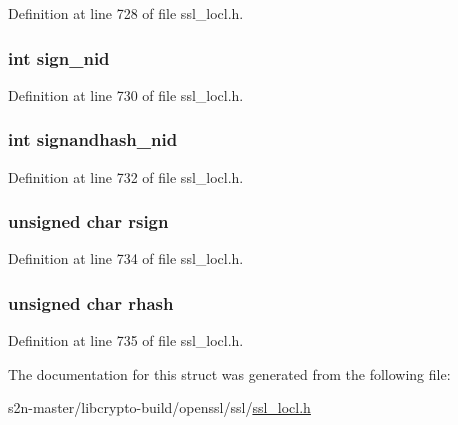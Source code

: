 Definition at line 728 of file ssl\+\_\+locl.\+h.

\subsubsection[{\texorpdfstring{sign\+\_\+nid}{sign_nid}}]{\setlength{\rightskip}{0pt plus 5cm}int sign\+\_\+nid}\hypertarget{structtls__sigalgs__st_aafb153cff89c5e6913e7b2365e381043}{}\label{structtls__sigalgs__st_aafb153cff89c5e6913e7b2365e381043}


Definition at line 730 of file ssl\+\_\+locl.\+h.

\subsubsection[{\texorpdfstring{signandhash\+\_\+nid}{signandhash_nid}}]{\setlength{\rightskip}{0pt plus 5cm}int signandhash\+\_\+nid}\hypertarget{structtls__sigalgs__st_a141706c812b5ebef022a22be107e514a}{}\label{structtls__sigalgs__st_a141706c812b5ebef022a22be107e514a}


Definition at line 732 of file ssl\+\_\+locl.\+h.

\subsubsection[{\texorpdfstring{rsign}{rsign}}]{\setlength{\rightskip}{0pt plus 5cm}unsigned char rsign}\hypertarget{structtls__sigalgs__st_a303e77c024d90a4a9669ae541f63828c}{}\label{structtls__sigalgs__st_a303e77c024d90a4a9669ae541f63828c}


Definition at line 734 of file ssl\+\_\+locl.\+h.

\subsubsection[{\texorpdfstring{rhash}{rhash}}]{\setlength{\rightskip}{0pt plus 5cm}unsigned char rhash}\hypertarget{structtls__sigalgs__st_a4d59885a854ea907f366834b5322e059}{}\label{structtls__sigalgs__st_a4d59885a854ea907f366834b5322e059}


Definition at line 735 of file ssl\+\_\+locl.\+h.



The documentation for this struct was generated from the following file\+:\begin{DoxyCompactItemize}
\item 
s2n-\/master/libcrypto-\/build/openssl/ssl/\hyperlink{ssl__locl_8h}{ssl\+\_\+locl.\+h}\end{DoxyCompactItemize}
